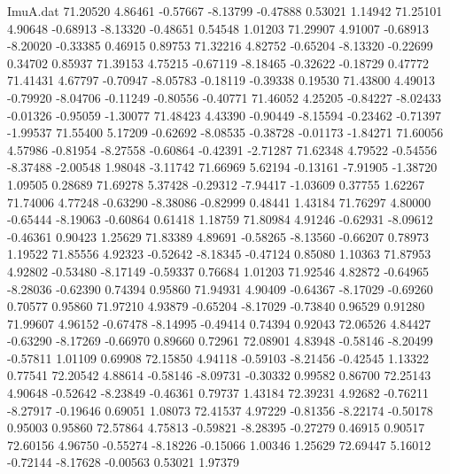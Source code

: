 \begin{filecontents}{ImuA.dat}
  71.20520    4.86461   -0.57667   -8.13799   -0.47888    0.53021    1.14942
  71.25101    4.90648   -0.68913   -8.13320   -0.48651    0.54548    1.01203
  71.29907    4.91007   -0.68913   -8.20020   -0.33385    0.46915    0.89753
  71.32216    4.82752   -0.65204   -8.13320   -0.22699    0.34702    0.85937
  71.39153    4.75215   -0.67119   -8.18465   -0.32622   -0.18729    0.47772
  71.41431    4.67797   -0.70947   -8.05783   -0.18119   -0.39338    0.19530
  71.43800    4.49013   -0.79920   -8.04706   -0.11249   -0.80556   -0.40771
  71.46052    4.25205   -0.84227   -8.02433   -0.01326   -0.95059   -1.30077
  71.48423    4.43390   -0.90449   -8.15594   -0.23462   -0.71397   -1.99537
  71.55400    5.17209   -0.62692   -8.08535   -0.38728   -0.01173   -1.84271
  71.60056    4.57986   -0.81954   -8.27558   -0.60864   -0.42391   -2.71287
  71.62348    4.79522   -0.54556   -8.37488   -2.00548    1.98048   -3.11742
  71.66969    5.62194   -0.13161   -7.91905   -1.38720    1.09505    0.28689
  71.69278    5.37428   -0.29312   -7.94417   -1.03609    0.37755    1.62267
  71.74006    4.77248   -0.63290   -8.38086   -0.82999    0.48441    1.43184
  71.76297    4.80000   -0.65444   -8.19063   -0.60864    0.61418    1.18759
  71.80984    4.91246   -0.62931   -8.09612   -0.46361    0.90423    1.25629
  71.83389    4.89691   -0.58265   -8.13560   -0.66207    0.78973    1.19522
  71.85556    4.92323   -0.52642   -8.18345   -0.47124    0.85080    1.10363
  71.87953    4.92802   -0.53480   -8.17149   -0.59337    0.76684    1.01203
  71.92546    4.82872   -0.64965   -8.28036   -0.62390    0.74394    0.95860
  71.94931    4.90409   -0.64367   -8.17029   -0.69260    0.70577    0.95860
  71.97210    4.93879   -0.65204   -8.17029   -0.73840    0.96529    0.91280
  71.99607    4.96152   -0.67478   -8.14995   -0.49414    0.74394    0.92043
  72.06526    4.84427   -0.63290   -8.17269   -0.66970    0.89660    0.72961
  72.08901    4.83948   -0.58146   -8.20499   -0.57811    1.01109    0.69908
  72.15850    4.94118   -0.59103   -8.21456   -0.42545    1.13322    0.77541
  72.20542    4.88614   -0.58146   -8.09731   -0.30332    0.99582    0.86700
  72.25143    4.90648   -0.52642   -8.23849   -0.46361    0.79737    1.43184
  72.39231    4.92682   -0.76211   -8.27917   -0.19646    0.69051    1.08073
  72.41537    4.97229   -0.81356   -8.22174   -0.50178    0.95003    0.95860
  72.57864    4.75813   -0.59821   -8.28395   -0.27279    0.46915    0.90517
  72.60156    4.96750   -0.55274   -8.18226   -0.15066    1.00346    1.25629
  72.69447    5.16012   -0.72144   -8.17628   -0.00563    0.53021    1.97379

\end{filecontents}
